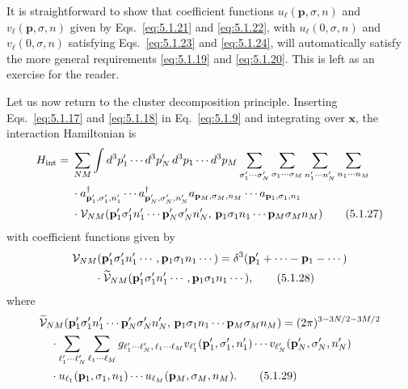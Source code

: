 It is straightforward to show that coefficient functions
$u_\ell(\mathbf{p},\sigma,n)$ and $v_\ell(\mathbf{p},\sigma,n)$ given by
Eqs.~\eqref{eq:5.1.21} and \eqref{eq:5.1.22}, with $u_\ell(0,\sigma,n)$ and
$v_\ell(0,\sigma,n)$ satisfying Eqs.~\eqref{eq:5.1.23} and \eqref{eq:5.1.24}, will automatically
satisfy the more general requirements \eqref{eq:5.1.19} and \eqref{eq:5.1.20}. This is left as
an exercise for the reader.

Let us now return to the cluster decomposition principle. Inserting
Eqs.~\eqref{eq:5.1.17} and \eqref{eq:5.1.18} in Eq.~\eqref{eq:5.1.9} and integrating over $\mathbf{x}$,
the interaction Hamiltonian is
\begin{align}
  H_{\mathrm{int}}={}&\sum_{NM}\int d^3p'_1\cdots d^3p'_N\,
  d^3p_1\cdots d^3p_M
  \sum_{\sigma'_1\cdots\sigma'_N}\sum_{\sigma_1\cdots\sigma_M}
  \sum_{n'_1\cdots n'_N}\sum_{n_1\cdots n_M}
  \notag\\
  &\cdot a^\dagger_{\mathbf{p}'_1,\sigma'_1,n'_1}\cdots
  a^\dagger_{\mathbf{p}'_N,\sigma'_N,n'_N}
  a_{\mathbf{p}_M,\sigma_M,n_M}\cdots a_{\mathbf{p}_1,\sigma_1,n_1}
  \notag\\
  &\cdot\mathcal{V}_{NM}(\mathbf{p}'_1\sigma'_1n'_1\cdots
  \mathbf{p}'_N\sigma'_Nn'_N,\,\mathbf{p}_1\sigma_1n_1\cdots
  \mathbf{p}_M\sigma_Mn_M)
  \tag{5.1.27}\label{eq:5.1.27}
\end{align}
with coefficient functions given by
\begin{align}
  &\mathcal{V}_{NM}(\mathbf{p}'_1\sigma'_1n'_1\cdots,
  \mathbf{p}_1\sigma_1n_1\cdots)
  =\delta^3(\mathbf{p}'_1+\cdots-\mathbf{p}_1-\cdots)
  \notag\\
  &\qquad\cdot\widetilde{\mathcal{V}}_{NM}
  (\mathbf{p}'_1\sigma'_1n'_1\cdots,\mathbf{p}_1\sigma_1n_1\cdots),
  \tag{5.1.28}\label{eq:5.1.28}
\end{align}
where
\begin{align}
  &\widetilde{\mathcal{V}}_{NM}(\mathbf{p}'_1\sigma'_1n'_1\cdots
  \mathbf{p}'_N\sigma'_Nn'_N,\,\mathbf{p}_1\sigma_1n_1\cdots
  \mathbf{p}_M\sigma_Mn_M)
  =(2\pi)^{3-3N/2-3M/2}
  \notag\\
  &\quad\cdot\sum_{\ell'_1\cdots\ell'_N}
  \sum_{\ell_1\cdots\ell_M}
  g_{\ell'_1\cdots\ell'_N,\,\ell_1\cdots\ell_M}
  v_{\ell'_1}(\mathbf{p}'_1,\sigma'_1,n'_1)\cdots
  v_{\ell'_N}(\mathbf{p}'_N,\sigma'_N,n'_N)
  \notag\\
  &\quad\cdot u_{\ell_1}(\mathbf{p}_1,\sigma_1,n_1)\cdots
  u_{\ell_M}(\mathbf{p}_M,\sigma_M,n_M).
  \tag{5.1.29}\label{eq:5.1.29}
\end{align}
